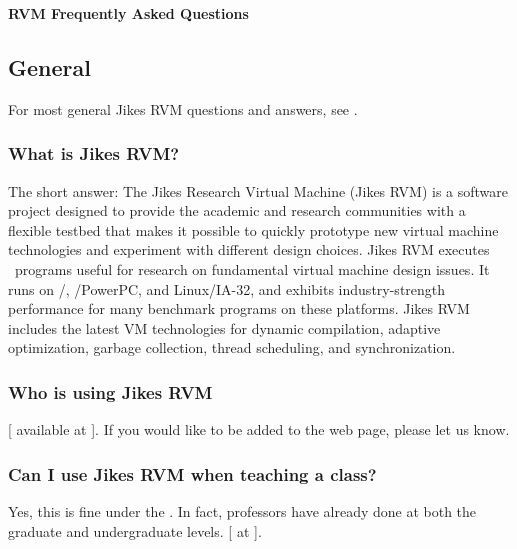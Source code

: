 \begin{center}  
{\bf \JikesTM{} RVM Frequently Asked Questions}
\end{center}

\subsection{General}

For most general Jikes RVM questions and answers, see
\xlink{{\tt \QandAURL}}{\QandAURL}.

\subsubsection{What is Jikes RVM?} 

The short answer:
The Jikes Research Virtual Machine (Jikes RVM) is a software project
designed to provide the academic and research communities with a
flexible testbed that makes it possible to quickly prototype new
virtual machine technologies and experiment with different design
choices.  Jikes RVM executes \JavaTM\ programs useful for research on
fundamental virtual machine design issues.
It runs on \AIXTM{}/\PowerPCTM{},
\LinuxR{}/PowerPC, and Linux/IA-32, 
and exhibits industry-strength performance for many benchmark programs
on these platforms.  Jikes RVM includes the latest VM
technologies for dynamic compilation, adaptive optimization, garbage
collection, thread scheduling, and synchronization.

\subsubsection{Who is using Jikes RVM}

[ available at
{\tt \RVMUsersURL}]{\RVMUsersURL}.  If you would like to 
be added to the web page, please let us know.

\subsubsection{Can I use Jikes RVM when teaching a class?}

Yes, this is fine under the
.  In fact,  professors
have already done at both the graduate and undergraduate levels.
[ at {\tt \RVMTeachingResourcesURL}]{\RVMTeachingResourcesURL}.


